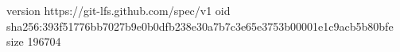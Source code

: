 version https://git-lfs.github.com/spec/v1
oid sha256:393f51776bb7027b9e0b0dfb238e30a7b7c3e65e3753b00001e1c9acb5b80bfe
size 196704
